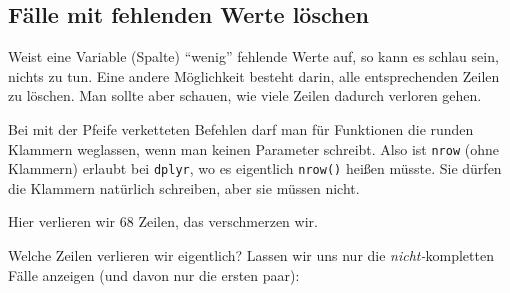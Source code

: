 \documentclass[12pt,ngerman,]{book}
\makeatletter
\newenvironment{Shaded}{\begin{snugshade}}{\end{snugshade}}
\newcommand{\KeywordTok}[1]{\textcolor[rgb]{0.13,0.29,0.53}{\textbf{{#1}}}}
\newcommand{\StringTok}[1]{\textcolor[rgb]{0.31,0.60,0.02}{{#1}}}
\newcommand{\CommentTok}[1]{\textcolor[rgb]{0.56,0.35,0.01}{\textit{{#1}}}}
\newcommand{\NormalTok}[1]{{#1}}
\newenvironment{kframe}{%
\medskip{}
\setlength{\fboxsep}{.8em}
 \def\at@end@of@kframe{}%
 \ifinner\ifhmode%
  \def\at@end@of@kframe{\end{minipage}}%
  \begin{minipage}{\columnwidth}%
 \fi\fi%
 \def\FrameCommand##1{\hskip\@totalleftmargin \hskip-\fboxsep
 \colorbox{shadecolor}{##1}\hskip-\fboxsep
     \hskip-\linewidth \hskip-\@totalleftmargin \hskip\columnwidth}%
 \MakeFramed {\advance\hsize-\width
   \@totalleftmargin\z@ \linewidth\hsize
   \@setminipage}}%
 {\par\unskip\endMakeFramed%
 \at@end@of@kframe}
\renewenvironment{Shaded}{\begin{kframe}}{\end{kframe}}
\theoremstyle{definition}
\theoremstyle{definition}
\theoremstyle{remark}
\let\BeginKnitrBlock\begin \let\EndKnitrBlock\end
\makeatother
\begin{document}
\subsection{Fälle mit fehlenden Werte
löschen}\label{falle-mit-fehlenden-werte-loschen}

Weist eine Variable (Spalte) ``wenig'' fehlende Werte auf, so kann es
schlau sein, nichts zu tun. Eine andere Möglichkeit besteht darin, alle
entsprechenden Zeilen zu löschen. Man sollte aber schauen, wie viele
Zeilen dadurch verloren gehen.

\begin{Shaded}
\end{Shaded}

\BeginKnitrBlock{rmdcaution}
Bei mit der Pfeife verketteten Befehlen darf man für Funktionen die
runden Klammern weglassen, wenn man keinen Parameter schreibt. Also ist
\texttt{nrow} (ohne Klammern) erlaubt bei \texttt{dplyr}, wo es
eigentlich \texttt{nrow()} heißen müsste. Sie dürfen die Klammern
natürlich schreiben, aber sie müssen nicht.
\EndKnitrBlock{rmdcaution}

Hier verlieren wir 68 Zeilen, das verschmerzen wir.

Welche Zeilen verlieren wir eigentlich? Lassen wir uns nur die
\emph{nicht-}kompletten Fälle anzeigen (und davon nur die ersten paar):

\begin{Shaded}
\end{Shaded}
\end{document}
